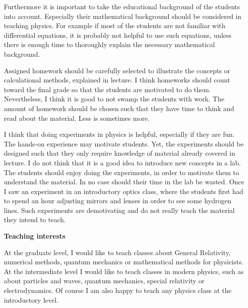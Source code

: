 \documentclass[11pt]{article}
\begin{document}
\begin{spacing}{0.95}
Furthermore it is important to take the educational background of the
students into account.  Especially their mathematical background should be
considered in teaching physics. For example if most of the students are not
familiar with differential equations, it is probably not helpful to use such
equations, unless there is enough time to thoroughly explain the necessary
mathematical background.

Assigned homework should be carefully selected to illustrate the concepts or
calculational methods, explained in lecture. I think homeworks should count
toward the final grade so that the students are motivated to do them. 
Nevertheless, I think it is good to not swamp the students with work. 
The amount of homework should be chosen such that they have time to 
think and read about the material. Less is sometimes more.

I think that doing experiments in physics is helpful, especially if they are
fun. The hands-on experience may motivate students. Yet, the experiments
should be designed such that they only require knowledge of material already
covered in lecture. I do not think that it is a good idea to introduce new
concepts in a lab. The students should enjoy doing the experiments, in order
to motivate them to understand the material. In no case should their time in
the lab be wasted. Once I saw an experiment in an introductory optics
class, where the students first had to spend an hour adjusting mirrors and
lenses in order to see some hydrogen lines. Such experiments are
demotivating and do not really teach the material they intend to teach.


\medskip
\noindent
{\bf Teaching interests}
\smallskip

At the graduate level, I would like to teach classes about General
Relativity, numerical methods, quantum mechanics or mathematical methods for
physicists. At the intermediate level I would like to teach classes in
modern physics, such as about particles and waves, quantum mechanics,
special relativity or electrodynamics. Of course I am also happy to teach
any physics class at the introductory level.








%
%
%
%
%





\end{spacing}
\end{document}
